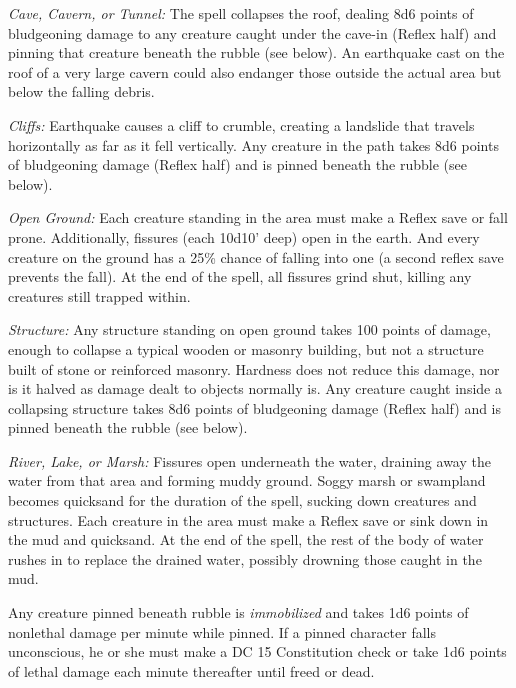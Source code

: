 \begin{list}{}{\leftmargin=1em}
\item \emph{Cave, Cavern, or Tunnel:}
The spell collapses the roof, dealing 8d6 points of bludgeoning damage to any creature caught under the cave-in (Reflex half) and pinning that creature beneath the rubble (see below).
An earthquake cast on the roof of a very large cavern could also endanger those outside the actual area but below the falling debris.

\item \emph{Cliffs:}
Earthquake causes a cliff to crumble, creating a landslide that travels horizontally as far as it fell vertically. 
Any creature in the path takes 8d6 points of bludgeoning damage (Reflex half) and is pinned beneath the rubble (see below).

\item \emph{Open Ground:}
Each creature standing in the area must make a Reflex save or fall prone. 
Additionally, fissures (each 10d10' deep) open in the earth. And every creature on the ground has a 25\% chance of falling into one (a second reflex save prevents the fall). 
At the end of the spell, all fissures grind shut, killing any creatures still trapped within.

\item \emph{Structure:}
Any structure standing on open ground takes 100 points of damage, enough to collapse a typical wooden or masonry building, but not a structure built of stone or reinforced masonry. 
Hardness does not reduce this damage, nor is it halved as damage dealt to objects normally is. 
Any creature caught inside a collapsing structure takes 8d6 points of bludgeoning damage (Reflex half) and is pinned beneath the rubble (see below).

\item \emph{River, Lake, or Marsh:}
Fissures open underneath the water, draining away the water from that area and forming muddy ground. 
Soggy marsh or swampland becomes quicksand for the duration of the spell, sucking down creatures and structures. 
Each creature in the area must make a Reflex save or sink down in the mud and quicksand. 
At the end of the spell, the rest of the body of water rushes in to replace the drained water, possibly drowning those caught in the mud.
\end{list}
Any creature pinned beneath rubble is \emph{immobilized} and takes 1d6 points of nonlethal damage per minute while pinned. 
If a pinned character falls unconscious, he or she must make a DC 15 Constitution check or take 1d6 points of lethal damage each minute thereafter until freed or dead.

